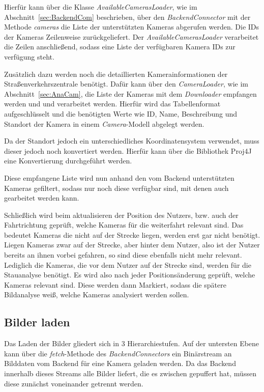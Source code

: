 Hierfür kann über die Klasse {\em AvailableCamerasLoader}, wie im Abschnitt~\ref{sec:BackendCom} beschrieben, über den {\em BackendConnector} mit der Methode {\em cameras} die Liste der unterstützten Kameras abgerufen werden.
Die IDs der Kameras Zeilenweise zurückgeliefert. Der {\em AvailableCamerasLoader} verarbeitet die Zeilen anschließend, sodass eine Liste der verfügbaren Kamera IDs zur verfügung steht.

Zusätzlich dazu werden noch die detaillierten Kamerainformationen der Straßenverkehrszentrale benötigt. Dafür kann über den {\em CameraLoader}, wie im Abschnitt~\ref{sec:AnaCam}, die Liste der Kameras mit dem {\em Downloader} empfangen werden und und verarbeitet werden. Hierfür wird das Tabellenformat aufgeschlüsselt und die benötigten Werte wie ID, Name, Beschreibung und Standort der Kamera in einem {\em Camera}-Modell abgelegt werden.

Da der Standort jedoch ein unterschiedliches Koordinatensystem verwendet, muss dieser jedoch noch konvertiert werden. Hierfür kann über die Bibliothek Proj4J~\cite{proj4j} eine Konvertierung durchgeführt werden.

Diese empfangene Liste wird nun anhand den vom Backend unterstützten Kameras gefiltert, sodass nur noch diese verfügbar sind, mit denen auch gearbeitet werden kann.

Schließlich wird beim aktualisieren der Position des Nutzers, bzw. auch der Fahrtrichtung geprüft, welche Kameras für die weiterfahrt relevant sind. Das bedeutet Kameras die nicht auf der Strecke liegen, werden erst gar nicht benötigt. Liegen Kameras zwar auf der Strecke, aber hinter dem Nutzer, also ist der Nutzer bereits an ihnen vorbei gefahren, so sind diese ebenfalls nicht mehr relevant. Lediglich die Kameras, die vor dem Nutzer auf der Strecke sind, werden für die Stauanalyse benötigt. 
Es wird also nach jeder Positionsänderung geprüft, welche Kameras relevant sind. Diese werden dann Markiert, sodass die spätere Bildanalyse weiß, welche Kameras analysiert werden sollen.

\subsection{Bilder laden}
Das Laden der Bilder gliedert sich in 3 Hierarchiestufen.
Auf der untersten Ebene kann über die {\em fetch}-Methode des {\em BackendConnectors} ein Binärstream an Bilddaten vom Backend für eine Kamera geladen werden.
Da das Backend innerhalb dieses Streams alle Bilder liefert, die es zwischen gepuffert hat, müssen diese zunächst voneinander getrennt werden.

